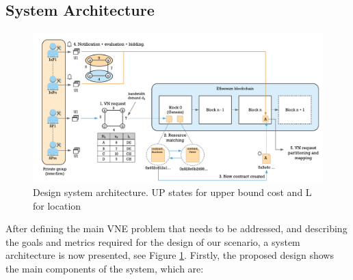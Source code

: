 \subsection{System Architecture}

\begin{figure}[bth]
	\centering
	\includegraphics[width=1\linewidth]{gfx/designWorkflow}    
  	\caption{Design system architecture. UP states for upper bound cost and L for location}
  	\label{fig:designWorkflow}
\end{figure}

After defining the main VNE problem that needs to be addressed, and describing the goals and metrics required for the design of our scenario, a system architecture is now presented, see Figure \ref{fig:designWorkflow}. Firstly, the proposed design shows the main components of the system, which are:

